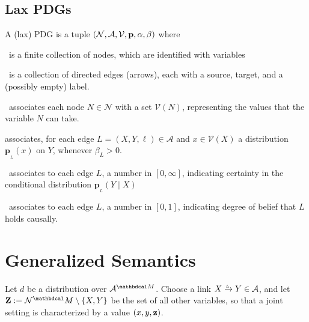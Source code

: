 \documentclass{article}
\newcommand{\bp}[1][L]{\mathbf{p}_{\!_#1\!}}
\newcommand{\V}{\mathcal V}
\newcommand{\N}{\mathcal N}
\newcommand{\Ed}{\mathcal A}
\newcommand{\ed}[3]{#2
	\overset{\smash{\mskip-5mu\raisebox{-1pt}{$\scriptscriptstyle
				#1$}}}{\rightarrow} #3}
\newcommand{\dg}[1]{\mathbdcal #1}
\begin{document}
	\subsection{Lax PDGs}
	\begin{defn}[PDG]\label{def:PDG}
		A (lax) PDG is a tuple $\pdgvars[]$ where
		\begin{description}[nosep]
			\item[$\N$]~is a finite collection of nodes, which are identified with variables
			\item[$\Ed$]~is a collection of directed edges (arrows), each with a source, target, and a (possibly empty) label.
			\item[$\V$]~associates each node $N \in \N$ with a set $\V(N)$,
			representing the values that the variable $N$ can take. 
			\item[$\mathbf p$] associates, for each edge $L = (X,Y, \ell) \in \Ed$ and $x \in \V(X)$ a distribution $\bp(x)$ on $Y$, whenever $\beta_L > 0$.
			\item[$\beta$]~associates to each edge $L$, a number in $[0,\infty]$, indicating certainty in the conditional distribution $\bp(Y \mid X)$ 
			\item[$\alpha$]~associates to each edge $L$, a number in $[0,1]$, indicating degree of belief that $L$ holds causally.
		\end{description}
		\vspace{-1.4em}
	\end{defn}
	

	
	\section{Generalized Semantics}
	Let $d$ be a distribution over $\Ed^{\dg M}$. 
	Choose a link $\ed LXY \in \Ed$, and let $\mathbf Z := \N^\dg M \setminus \{X, Y\}$ be the set of all other variables, so that a joint setting is characterized by a value $(x,y,\mathbf z)$.
	
\end{document}
